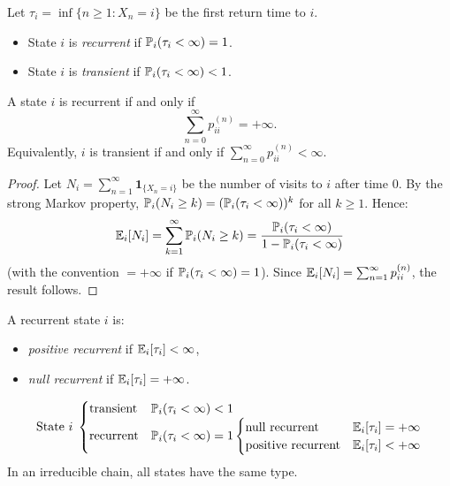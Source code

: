 \begin{definition}
\label{def:recurrence}
Let $\tau_i = \inf\{n \geq 1 : X_n = i\}$ be the first return time to $i$.
\begin{itemize}
  \item State $i$ is \emph{recurrent} if $\mathbb{P}_i(\tau_i < \infty) = 1$.
  \item State $i$ is \emph{transient} if $\mathbb{P}_i(\tau_i < \infty) < 1$.
\end{itemize}
\end{definition}

\begin{theorem}
\label{thm:recurrence_criterion}
A state $i$ is recurrent if and only if
\[
  \sum_{n=0}^{\infty} p_{ii}^{(n)} = +\infty.
\]
Equivalently, $i$ is transient if and only if $\sum_{n=0}^{\infty} p_{ii}^{(n)} < \infty$.
\end{theorem}

\begin{proof}
Let $N_i = \sum_{n=1}^{\infty} \mathbf{1}_{\{X_n = i\}}$ be the number of visits
to $i$ after time $0$. By the strong Markov property,
$\mathbb{P}_i(N_i \geq k) = (\mathbb{P}_i(\tau_i < \infty))^k$ for all $k \geq 1$. Hence:
\[
  \mathbb{E}_i[N_i] = \sum_{k=1}^{\infty} \mathbb{P}_i(N_i \geq k)
  = \frac{\mathbb{P}_i(\tau_i < \infty)}{1 - \mathbb{P}_i(\tau_i < \infty)}
\]
(with the convention $= +\infty$ if $\mathbb{P}_i(\tau_i < \infty) = 1$).
Since $\mathbb{E}_i[N_i] = \sum_{n=1}^{\infty} p_{ii}^{(n)}$, the result follows.
\end{proof}

\begin{definition}
A recurrent state $i$ is:
\begin{itemize}
  \item \emph{positive recurrent} if $\mathbb{E}_i[\tau_i] < \infty$,
  \item \emph{null recurrent} if $\mathbb{E}_i[\tau_i] = +\infty$.
\end{itemize}
\end{definition}

\begin{keyformulas}[title=\textbf{State Classification}]
\[
\text{State } i \;\begin{cases}
  \text{transient} & \mathbb{P}_i(\tau_i < \infty) < 1 \\
  \text{recurrent} & \mathbb{P}_i(\tau_i < \infty) = 1
    \begin{cases}
      \text{null recurrent} & \mathbb{E}_i[\tau_i] = +\infty \\
      \text{positive recurrent} & \mathbb{E}_i[\tau_i] < +\infty
    \end{cases}
\end{cases}
\]
In an irreducible chain, all states have the same type.
\end{keyformulas}


